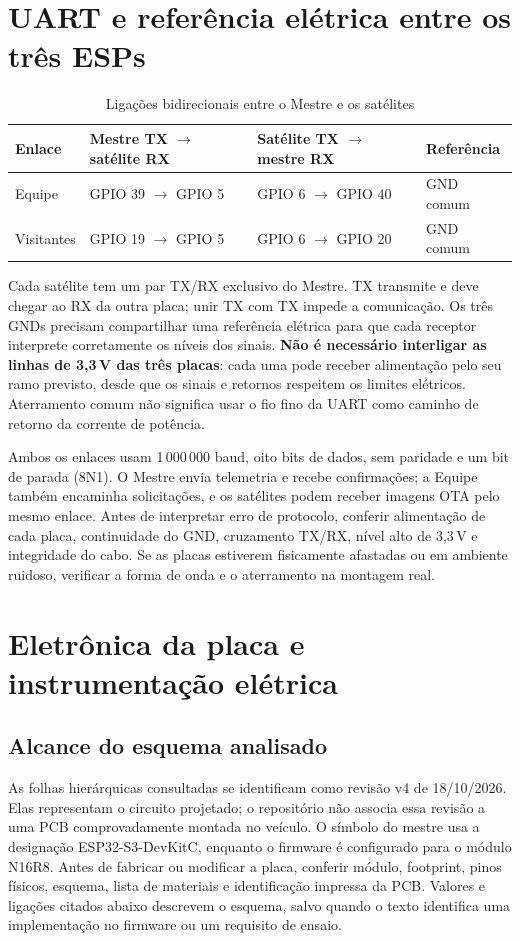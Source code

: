 \section{UART e referência elétrica entre os três ESPs}
\begin{table}[htbp]\centering\small
\caption{Ligações bidirecionais entre o Mestre e os satélites}\label{tab:uart-fios}
\begin{tabularx}{\textwidth}{@{}p{2.2cm}X X p{1.8cm}@{}}\toprule
Enlace & Mestre TX $\to$ satélite RX & Satélite TX $\to$ mestre RX & Referência\\\midrule
Equipe & GPIO 39 $\to$ GPIO 5 & GPIO 6 $\to$ GPIO 40 & GND comum\\
Visitantes & GPIO 19 $\to$ GPIO 5 & GPIO 6 $\to$ GPIO 20 & GND comum\\\bottomrule
\end{tabularx}\end{table}
Cada satélite tem um par TX/RX exclusivo do Mestre. TX transmite e deve chegar ao RX da outra placa; unir TX com TX impede a comunicação. Os três GNDs precisam compartilhar uma referência elétrica para que cada receptor interprete corretamente os níveis dos sinais. \textbf{Não é necessário interligar as linhas de 3,3\,V das três placas}: cada uma pode receber alimentação pelo seu ramo previsto, desde que os sinais e retornos respeitem os limites elétricos. Aterramento comum não significa usar o fio fino da UART como caminho de retorno da corrente de potência.

Ambos os enlaces usam 1\,000\,000 baud, oito bits de dados, sem paridade e um bit de parada (8N1). O Mestre envia telemetria e recebe confirmações; a Equipe também encaminha solicitações, e os satélites podem receber imagens OTA pelo mesmo enlace. Antes de interpretar erro de protocolo, conferir alimentação de cada placa, continuidade do GND, cruzamento TX/RX, nível alto de 3,3\,V e integridade do cabo. Se as placas estiverem fisicamente afastadas ou em ambiente ruidoso, verificar a forma de onda e o aterramento na montagem real.

\section{Eletrônica da placa e instrumentação elétrica}\label{sec:eletronica}
\subsection{Alcance do esquema analisado}
As folhas hierárquicas consultadas se identificam como revisão v4 de 18/10/2026. Elas representam o circuito projetado; o repositório não associa essa revisão a uma PCB comprovadamente montada no veículo. O símbolo do mestre usa a designação ESP32-S3-DevKitC, enquanto o firmware é configurado para o módulo N16R8. Antes de fabricar ou modificar a placa, conferir módulo, footprint, pinos físicos, esquema, lista de materiais e identificação impressa da PCB. Valores e ligações citados abaixo descrevem o esquema, salvo quando o texto identifica uma implementação no firmware ou um requisito de ensaio.

